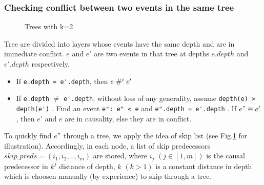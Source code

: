 \documentclass{llncs}
\begin{document}
\subsubsection{Checking conflict between two events in the same tree}
\begin{figure}
	
	\caption{Trees with k=2 \label{fig:example}}
\end{figure}

Tree are divided into layers whose events have the same depth and are in immediate conflict.
$e$ and $e'$ are two events in that tree at depths $e.depth$ and $e'.depth$ respectively.
\begin{itemize}
	\item
	If \verb!e.depth = e'.depth!, then $e \mathrel{\#^i_{}} e'$
	\item
	If \verb!e.depth! $\neq$ \verb!e'.depth!, without loss of any generality, assume  \verb!depth(e) > depth(e')! . Find an event \verb!e": e" < e! and \verb!e".depth = e'.depth! . If $e" \equiv e'$, then $e'$ and $e$ are in causality, else they are in conflict.
\end{itemize}

\noindent
To quickly find $e"$ through a tree, we apply the idea of skip list (see Fig.\ref{fig:example} for illustration).
Accordingly, in each node, a list of skip predecessors $
skip\_preds = (i_1, i_2,..,i_m)$ are stored, where $i_j$ $(j \in [1,m] )$ is the causal predecessor in $k^{j}$ distance of depth, $k$ $(k > 1)$ is a constant distance in depth which is choosen manually (by experience) to skip through a tree.\\
\end{document}
